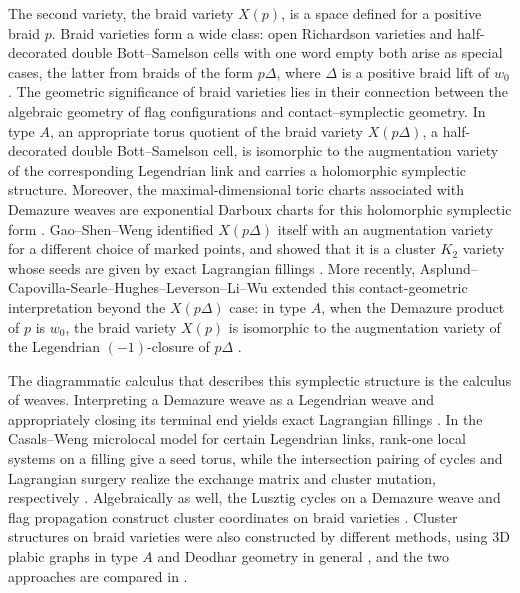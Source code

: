 \documentclass[10pt,a4paper]{article}
\theoremstyle{definition}
\theoremstyle{remark}
\begin{document}
The second variety, the braid variety \(X(p)\), is a space defined for a positive
braid \(p\).  Braid varieties form a wide class: open Richardson varieties and
half-decorated double Bott--Samelson cells with one word empty both arise as
special cases, the latter from braids of the form \(p\Delta\), where \(\Delta\)
is a positive braid lift of \(w_0\).  The geometric significance of braid
varieties lies in their connection between the algebraic geometry of flag
configurations and contact--symplectic geometry.  In type \(A\), an appropriate
torus quotient of the braid variety \(X(p\Delta)\), a half-decorated double
Bott--Samelson cell, is isomorphic to the augmentation variety of the
corresponding Legendrian link and carries a holomorphic symplectic structure.
Moreover, the maximal-dimensional toric charts associated with Demazure weaves
are exponential Darboux charts for this holomorphic symplectic form
\cite{CasalsGorskyGorskySimental2020}.  Gao--Shen--Weng identified
\(X(p\Delta)\) itself with an augmentation variety for a different choice of
marked points, and showed that it is a cluster \(K_2\) variety whose seeds are
given by exact Lagrangian fillings \cite{GaoShenWeng2024}.
More recently, Asplund--Capovilla-Searle--Hughes--Leverson--Li--Wu extended 
this contact-geometric interpretation beyond the \(X(p\Delta)\) case: 
in type \(A\), when the Demazure product of \(p\) is \(w_0\), the braid variety 
\(X(p)\) is isomorphic to the augmentation variety of the Legendrian \((-1)\)-closure 
of \(p\Delta\) \cite{AsplundEtAlDecompositions2025}.

The diagrammatic calculus that describes this symplectic structure is the
calculus of weaves.  Interpreting a Demazure weave as a Legendrian weave and
appropriately closing its terminal end yields exact Lagrangian fillings
\cite{CasalsZaslow2022,CasalsGorskyGorskySimental2020}.  In the Casals--Weng
microlocal model for certain Legendrian links, rank-one local systems on a
filling give a seed torus, while the intersection pairing of cycles and
Lagrangian surgery realize the exchange matrix and cluster mutation,
respectively \cite{CasalsWeng2024}.  Algebraically as well, the Lusztig cycles
on a Demazure weave and flag propagation construct cluster coordinates on
braid varieties \cite{CasalsEtAlBraidVarieties}.  Cluster structures on braid
varieties were also constructed by different methods, using 3D plabic graphs in
type \(A\) \cite{GalashinLamShermanBennettSpeyer2022} and Deodhar geometry in
general \cite{GalashinLamShermanBennett2023}, and the two approaches are
compared in \cite{CasalsEtAlComparing2025}.
\end{document}
